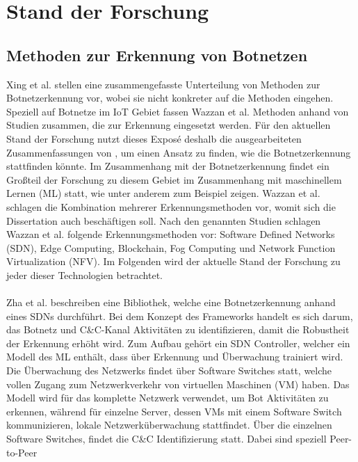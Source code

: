 \section{Stand der Forschung}
\label{sec:research}

\subsection*{Methoden zur Erkennung von Botnetzen}
Xing et al. \cite{Xing2021SurveyOB} stellen eine zusammengefasste Unterteilung von Methoden zur Botnetzerkennung vor, wobei sie nicht konkreter auf die Methoden eingehen. Speziell auf Botnetze im IoT
Gebiet fassen Wazzan et al. \cite{Wazzan2021InternetOT} Methoden anhand von Studien zusammen, die zur Erkennung eingesetzt werden. Für den aktuellen Stand der Forschung nutzt dieses Exposé deshalb die
ausgearbeiteten Zusammenfassungen von \cite{Wazzan2021InternetOT}, um einen Ansatz zu finden, wie die Botnetzerkennung stattfinden könnte. Im Zusammenhang mit der Botnetzerkennung findet ein Großteil
der Forschung zu diesem Gebiet im Zusammenhang mit maschinellem Lernen (ML) statt, wie unter anderem zum Beispiel \cite{SAlrayes2022ModelingOB,DBLP:journals/comcom/Alani22,Habtamu2022ASR, D2022ARO}
zeigen. Wazzan et al. schlagen die Kombination mehrerer Erkennungsmethoden vor, womit sich die Dissertation auch beschäftigen soll. Nach den genannten Studien schlagen Wazzan et al. folgende
Erkennungsmethoden vor: Software Defined Networks (SDN), Edge Computing, Blockchain, Fog Computing und Network Function Virtualization (NFV). Im Folgenden wird der aktuelle Stand der Forschung zu
jeder dieser Technologien betrachtet. \\ \\ Zha et al. \cite{DBLP:conf/cns/Zha0GMC19} beschreiben eine Bibliothek, welche eine Botnetzerkennung anhand eines SDNs durchführt.
Bei dem Konzept des Frameworks handelt es sich darum, das Botnetz und C\&C-Kanal Aktivitäten zu identifizieren, damit die Robustheit der Erkennung erhöht wird. Zum Aufbau gehört ein SDN
Controller, welcher ein Modell des ML enthält, dass über Erkennung und Überwachung trainiert wird. Die Überwachung des Netzwerks findet über Software Switches statt, welche vollen Zugang zum
Netzwerkverkehr von virtuellen Maschinen (VM) haben. Das Modell wird für das komplette Netzwerk verwendet, um Bot Aktivitäten zu erkennen, während für einzelne Server, dessen VMs mit
einem Software Switch kommunizieren, lokale Netzwerküberwachung stattfindet. Über die einzelnen Software Switches, findet die C\&C Identifizierung statt. Dabei sind speziell Peer-to-Peer
